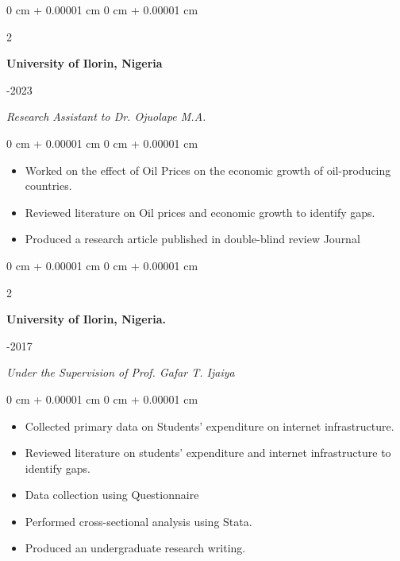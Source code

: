 \documentclass[10pt, letterpaper]{article}
\newenvironment{onecolentry}{
    \begin{adjustwidth}{
        0 cm + 0.00001 cm
    }{
        0 cm + 0.00001 cm
    }
}{
    \end{adjustwidth}
} %
\newenvironment{twocolentry}[2][]{
    \onecolentry
    \def\secondColumn{#2}
    \setcolumnwidth{\fill, 4.5 cm}
    \begin{paracol}{2}
}{
    \switchcolumn \raggedleft \secondColumn
    \end{paracol}
    \endonecolentry
} %
\begin{document}
\vspace{0.3cm}
\begin{twocolentry}{
2021-2023
}
\textbf{University of Ilorin, Nigeria}
\end{twocolentry}
\textit{Research Assistant to Dr. Ojuolape M.A.}
\begin{onecolentry}
    \begin{itemize}
    \item Worked on the effect of Oil Prices on the economic growth of oil-producing countries.
    \item Reviewed literature on Oil prices and economic growth to identify gaps. 
\end{itemize}
\begin{itemize}
    \item Produced a research article published in double-blind review Journal
\end{itemize}
\end{onecolentry}

\vspace{0.3cm}
\begin{twocolentry}{
2016-2017
}
   \textbf{University of Ilorin, Nigeria. }
\end{twocolentry}
\textit{Under the Supervision of Prof. Gafar T. Ijaiya}
\begin{onecolentry}
    \begin{itemize}
    \item Collected primary data on Students' expenditure on internet infrastructure. 
    \item Reviewed literature on students’ expenditure and internet infrastructure to identify gaps. 
    \item Data collection using Questionnaire
    \item Performed cross-sectional analysis using Stata. \item Produced an undergraduate research writing. \end{itemize}
\end{onecolentry}
\end{document}
